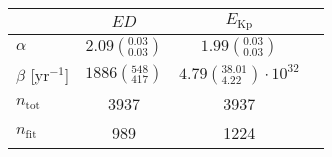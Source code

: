 \begin{tabular}{lccr}
\hline
  &                               $ED$ &                                  $E_\mathrm{Kp}$ \\
\hline
$\alpha$            &  $2.09\left(^{0.03}_{0.03}\right)$ &                $1.99\left(^{0.03}_{0.03}\right)$ \\
$\beta$ [yr$^{-1}$] &    $1886\left(^{548}_{417}\right)$ &  $4.79\left(^{38.01}_{4.22}\right)\cdot 10^{32}$ \\
$n_\mathrm{tot}$    &                               3937 &                                             3937 \\
$n_\mathrm{fit}$    &                                989 &                                             1224 \\
\hline

\end{tabular}
